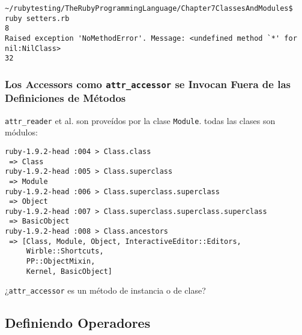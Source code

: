 \begin{verbatim}
~/rubytesting/TheRubyProgrammingLanguage/Chapter7ClassesAndModules$ ruby setters.rb
8
Raised exception 'NoMethodError'. Message: <undefined method `*' for nil:NilClass>
32
\end{verbatim}


\subsubsection{Los Accessors como {\tt attr\_accessor} se Invocan Fuera de las Definiciones de Métodos}
\verb|attr_reader| et al. son proveídos por la clase \verb|Module|.
todas las clases son módulos:
\begin{verbatim}
ruby-1.9.2-head :004 > Class.class
 => Class 
ruby-1.9.2-head :005 > Class.superclass
 => Module 
ruby-1.9.2-head :006 > Class.superclass.superclass
 => Object 
ruby-1.9.2-head :007 > Class.superclass.superclass.superclass
 => BasicObject 
ruby-1.9.2-head :008 > Class.ancestors
 => [Class, Module, Object, InteractiveEditor::Editors, 
     Wirble::Shortcuts, 
     PP::ObjectMixin, 
     Kernel, BasicObject] 
\end{verbatim}

\begin{exercise}
¿\verb|attr_accessor| es un método de instancia o de clase?
\end{exercise}

\subsection{Definiendo Operadores}
\label{subsection:definiendooperadores}


